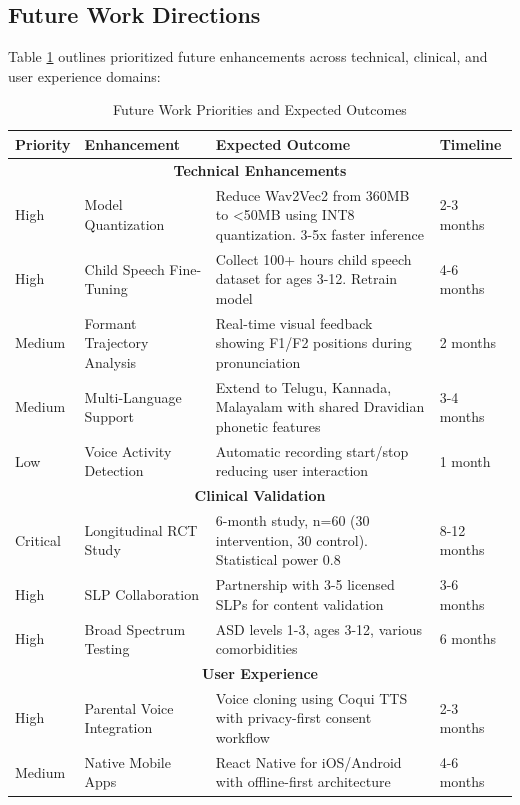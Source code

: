 \documentclass[12pt,a4paper]{article}
\begin{document}
\subsection{Future Work Directions}

Table \ref{tab:future_work} outlines prioritized future enhancements across technical, clinical, and user experience domains:

\begin{table}[H]
\centering
\caption{Future Work Priorities and Expected Outcomes}
\label{tab:future_work}
\tiny
\begin{tabular}{p{1cm}p{4cm}p{5.5cm}p{2cm}}
\toprule
\textbf{Priority} & \textbf{Enhancement} & \textbf{Expected Outcome} & \textbf{Timeline} \\
\midrule
\multicolumn{4}{c}{\textbf{Technical Enhancements}} \\
\midrule
High & Model Quantization & Reduce Wav2Vec2 from 360MB to <50MB using INT8 quantization. 3-5x faster inference & 2-3 months \\
\hline
High & Child Speech Fine-Tuning & Collect 100+ hours child speech dataset for ages 3-12. Retrain model & 4-6 months \\
\hline
Medium & Formant Trajectory Analysis & Real-time visual feedback showing F1/F2 positions during pronunciation & 2 months \\
\hline
Medium & Multi-Language Support & Extend to Telugu, Kannada, Malayalam with shared Dravidian phonetic features & 3-4 months \\
\hline
Low & Voice Activity Detection & Automatic recording start/stop reducing user interaction & 1 month \\
\midrule
\multicolumn{4}{c}{\textbf{Clinical Validation}} \\
\midrule
Critical & Longitudinal RCT Study & 6-month study, n=60 (30 intervention, 30 control). Statistical power 0.8 & 8-12 months \\
\hline
High & SLP Collaboration & Partnership with 3-5 licensed SLPs for content validation & 3-6 months \\
\hline
High & Broad Spectrum Testing & ASD levels 1-3, ages 3-12, various comorbidities & 6 months \\
\midrule
\multicolumn{4}{c}{\textbf{User Experience}} \\
\midrule
High & Parental Voice Integration & Voice cloning using Coqui TTS with privacy-first consent workflow & 2-3 months \\
\hline
Medium & Native Mobile Apps & React Native for iOS/Android with offline-first architecture & 4-6 months \\

\end{tabular}
\end{table}
\end{document}
